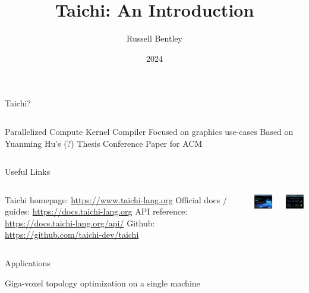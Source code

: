 \documentclass{beamer}
\title{Taichi: An Introduction}
\author{Russell Bentley}
\institute{Stony Brook}
\date{2024}
\begin{document}
\frame{\titlepage}

\begin{frame}{Taichi?}
\begin{columns}
\centering
\begin{outline}
  \1 Parallelized Compute Kernel Compiler
    \2 Focused on graphics use-cases 
  \1 Based on Yuanming Hu's (?) Thesis
    \2 Conference Paper for ACM  
\end{outline}
\centering
{} 


\end{columns}
\end{frame}

\begin{frame}{Useful Links}
\begin{columns}
\centering
\begin{outline}
  \1 Taichi homepage: \url{https://www.taichi-lang.org}
  \1 Official docs / guides: \url{https://docs.taichi-lang.org}
  \1 API reference: \url{https://docs.taichi-lang.org/api/}
  \1 Github: \url{https://github.com/taichi-dev/taichi}
\end{outline}
\centering
\includegraphics[width=2.5cm]{taichi_lang_org.png} 

\includegraphics[width=2.5cm]{taichi_lang_org_advantages.png} 

\end{columns}
\end{frame}

\begin{frame}{Applications}
  \begin{outline}
    \1 Giga-voxel topology optimization on a single machine \cite{Liu2018}

  \end{outline}
\end{frame}
\end{document}
